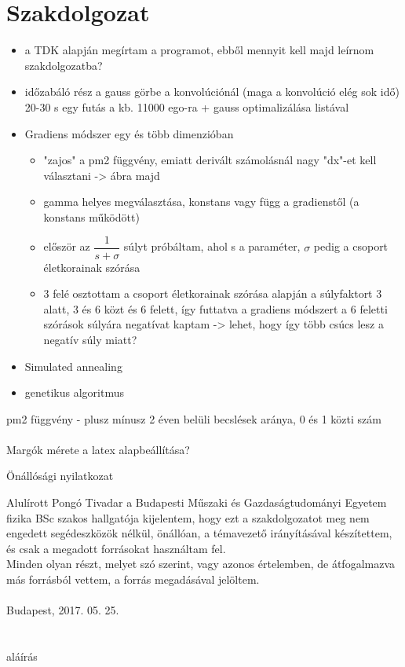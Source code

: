 \documentclass[12pt]{article}
\begin{document}
\section*{Szakdolgozat}
\begin{itemize}
	\item a TDK alapján megírtam a programot, ebből mennyit kell majd leírnom szakdolgozatba?
	\item időzabáló rész a gauss görbe a konvolúciónál (maga a konvolúció elég sok idő) 20-30 s egy futás a kb. 11000 ego-ra + gauss optimalizálása listával
	\item Gradiens módszer egy és több dimenzióban
	\begin{itemize}
		\item "zajos" a pm2 függvény, emiatt derivált számolásnál nagy "dx"-et kell választani -> ábra majd
		\item gamma helyes megválasztása, konstans vagy függ a gradienstől (a konstans működött)
		\item először az $\dfrac{1}{s + \sigma}$ súlyt próbáltam, ahol s a paraméter, $\sigma$ pedig a csoport életkorainak szórása
		\item 3 felé osztottam a csoport életkorainak szórása alapján a súlyfaktort 3 alatt, 3 és 6 közt és 6 felett, így futtatva a gradiens módszert a 6 feletti szórások súlyára negatívat kaptam -> lehet, hogy így több csúcs lesz a negatív súly miatt?
	\end{itemize}
	\item Simulated annealing
	\item genetikus algoritmus
\end{itemize}
pm2 függvény - plusz mínusz 2 éven belüli becslések aránya, 0 és 1 közti szám \\ \\
Margók mérete a latex alapbeállítása?
\fi


\pagebreak
\begin{center}
	{\Huge Önállósági nyilatkozat}
\end{center}
\medskip
Alulírott Pongó Tivadar a Budapesti Műszaki és Gazdaságtudományi Egyetem fizika BSc szakos hallgatója kijelentem, hogy ezt a szakdolgozatot meg nem engedett segédeszközök nélkül, önállóan, a témavezető irányításával készítettem, és csak a megadott forrásokat használtam fel. \\
Minden olyan részt, melyet szó szerint, vagy azonos értelemben, de átfogalmazva más forrásból vettem, a forrás megadásával jelöltem.\\\\
Budapest, 2017. 05. 25. \\ \\ \\ %
\hspace*{100mm}aláírás
\pagebreak
\tableofcontents
\pagebreak
\end{document}
